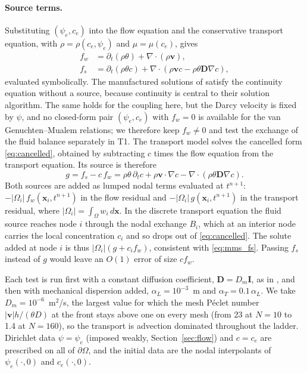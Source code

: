 \paragraph{Source terms.}
Substituting $(\psi_e,c_e)$ into the flow equation and the conservative
transport equation, with $\rho=\rho(c_e,\psi_e)$ and $\mu=\mu(c_e)$, gives
\begin{align}
  f_w &= \partial_t(\rho\theta) + \nabla\cdot(\rho\mathbf{v}),
  \label{eq:mms_fw}\\
  f_s &= \partial_t(\rho\theta c) + \nabla\cdot(\rho\mathbf{v}c - \rho\theta\mathbf{D}\nabla c),
  \label{eq:mms_fs}
\end{align}
evaluated symbolically. The manufactured solutions of \cite{shunn2012} satisfy
the continuity equation without a source, because continuity is central to
their solution algorithm. The same holds for the coupling here, but the Darcy
velocity is fixed by $\psi$, and no closed-form pair $(\psi_e,c_e)$ with
$f_w=0$ is available for the van Genuchten--Mualem relations; we therefore
keep $f_w\neq0$ and test the exchange of the fluid balance separately in T1.
The transport model solves the cancelled form \eqref{eq:cancelled}, obtained
by subtracting $c$ times the flow equation from the transport equation. Its
source is therefore
\begin{equation}
  g = f_s - c\,f_w
    = \rho\theta\,\partial_t c + \rho\mathbf{v}\cdot\nabla c
      - \nabla\cdot(\rho\theta\mathbf{D}\nabla c).
  \label{eq:mms_g}
\end{equation}
Both sources are added as lumped nodal terms evaluated at $t^{n+1}$:
$-|\Omega_i|\,f_w(\mathbf{x}_i,t^{n+1})$ in the flow residual and
$-|\Omega_i|\,g(\mathbf{x}_i,t^{n+1})$ in the transport residual, where
$|\Omega_i|=\int_\Omega w_i\,d\mathbf{x}$. In the discrete transport equation
the fluid source reaches node $i$ through the nodal exchange $B_i$, which at
an interior node carries the local concentration $c_i$ and so drops out of
\eqref{eq:cancelled}. The solute added at node $i$ is thus
$|\Omega_i|(g+c_i f_w)$, consistent with \eqref{eq:mms_fs}. Passing $f_s$
instead of $g$ would leave an $O(1)$ error of size $c f_w$.

Each test is run first with a constant diffusion coefficient,
$\mathbf{D}=D_m\mathbf{I}$, as in \cite{suciu2021}, and then with mechanical
dispersion added, $\alpha_L=10^{-3}$~m and $\alpha_T=0.1\,\alpha_L$. We take
$D_m=10^{-6}$~m$^2$/s, the largest value for which the mesh P\'eclet number
$|\mathbf{v}|h/(\theta D)$ at the front stays above one on every mesh (from
23 at $N=10$ to 1.4 at $N=160$), so the transport is advection dominated
throughout the ladder. Dirichlet data $\psi=\psi_e$ (imposed weakly,
Section~\ref{sec:flow}) and $c=c_e$ are prescribed on all of $\partial\Omega$,
and the initial data are the nodal interpolants of $\psi_e(\cdot,0)$ and
$c_e(\cdot,0)$.

